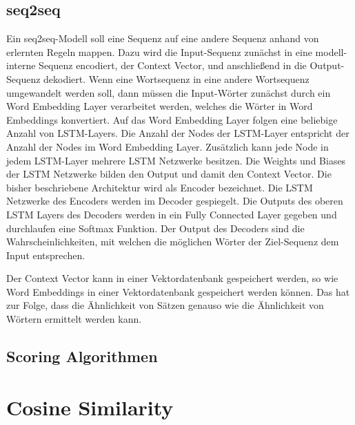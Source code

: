 \subsection{seq2seq}
Ein seq2seq-Modell soll eine Sequenz auf eine andere Sequenz anhand von erlernten Regeln mappen.
Dazu wird die Input-Sequenz zunächst in eine modell-interne Sequenz encodiert, der Context Vector, und anschließend in die Output-Sequenz dekodiert.
Wenn eine Wortsequenz in eine andere Wortsequenz umgewandelt werden soll, dann müssen die Input-Wörter zunächst durch ein Word Embedding Layer verarbeitet werden, welches die Wörter in Word Embeddings konvertiert.
Auf das Word Embedding Layer folgen eine beliebige Anzahl von LSTM-Layers.
Die Anzahl der Nodes der LSTM-Layer entspricht der Anzahl der Nodes im Word Embedding Layer.
Zusätzlich kann jede Node in jedem LSTM-Layer mehrere LSTM Netzwerke besitzen.
Die Weights und Biases der LSTM Netzwerke bilden den Output und damit den Context Vector.
Die bisher beschriebene Architektur wird als Encoder bezeichnet.
Die LSTM Netzwerke des Encoders werden im Decoder gespiegelt.
Die Outputs des oberen LSTM Layers des Decoders werden in ein Fully Connected Layer gegeben und durchlaufen eine Softmax Funktion.
Der Output des Decoders sind die Wahrscheinlichkeiten, mit welchen die möglichen Wörter der Ziel-Sequenz dem Input entsprechen. 

Der Context Vector kann in einer Vektordatenbank gespeichert werden, so wie Word Embeddings in einer Vektordatenbank gespeichert werden können.
Das hat zur Folge, dass die Ähnlichkeit von Sätzen genauso wie die Ähnlichkeit von Wörtern ermittelt werden kann.

\subsection{Scoring Algorithmen}

\section{Cosine Similarity}

